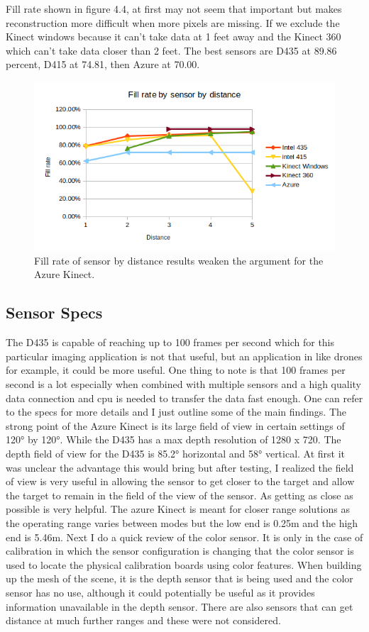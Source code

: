 Fill rate shown in figure 4.4, at first may not seem that important but makes reconstruction more difficult when more pixels are missing. If we exclude the Kinect windows because it can't take data at 1 feet away and the Kinect 360 which can't take data closer than 2 feet. The best sensors are D435 at 89.86 percent, D415 at 74.81, then Azure at 70.00.
\begin{figure}[!htb]
	\caption{Fill rate of sensor by distance results weaken the argument for the Azure Kinect.}
	\centering
	\includegraphics[width=1\textwidth]{images/fill_rate.png}
\end{figure}

\subsection{Sensor Specs}
The D435 is capable of reaching up to 100 frames per second which for this particular imaging application is not that useful, but an application in like drones for example, it could be more useful. One thing to note is that 100 frames per second is a lot especially when combined with multiple sensors and a high quality data connection and cpu is needed to transfer the data fast enough. One can refer to the specs for more details and I just outline some of the main findings. The strong point of the Azure Kinect is its large field of view in certain settings of \ang{120} by \ang{120}. While the D435 has a max depth resolution of 1280 x 720. The depth field of view for the D435 is \ang{85.2} horizontal and \ang{58} vertical. At first it was unclear the advantage this would bring but after testing, I realized the field of view is very useful in allowing the sensor to get closer to the target and allow the target to remain in the field of the view of the sensor. As getting as close as possible is very helpful. The azure Kinect is meant for closer range solutions as the operating range varies between modes but the low end is 0.25m and the high end is 5.46m. Next I do a quick review of the color sensor. It is only in the case of calibration in which the sensor configuration is changing that the color sensor is used to locate the physical calibration boards using color features. When building up the mesh of the scene, it is the depth sensor that is being used and the color sensor has no use, although it could potentially be useful as it provides information unavailable in the depth sensor. There are also sensors that can get distance at much further ranges and these were not considered.


